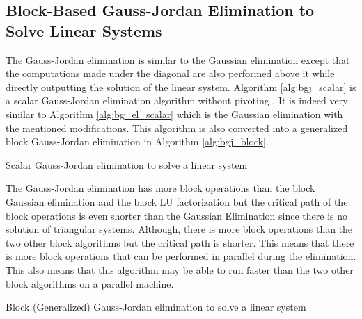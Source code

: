 \subsection{Block-Based Gauss-Jordan Elimination to Solve Linear Systems}

The Gauss-Jordan elimination \cite{Petit1989} \cite{Attaw2012} is similar to the Gaussian elimination except that the computations made under the diagonal are also performed above it while directly outputting the solution of the linear system.
Algorithm \ref{alg:bgj_scalar} is a scalar Gauss-Jordan elimination algorithm without pivoting \cite{Attaw2012}.
It is indeed very similar to Algorithm \ref{alg:bg_el_scalar} which is the Gaussian elimination with the mentioned modifications.
This algorithm is also converted into a generalized block Gauss-Jordan elimination \cite{MelTP1999} in Algorithm \ref{alg:bgj_block}.

\begin{algorithm}[h]
	\DontPrintSemicolon
	\caption{Scalar Gauss-Jordan elimination to solve a linear system \label{alg:bgj_scalar} }
\end{algorithm}

The Gauss-Jordan elimination has more block operations than the block Gaussian elimination and the block LU factorization but the critical path of the block operations is even shorter than the Gaussian Elimination since there is no solution of triangular systems.
Although, there is more block operations than the two other block algorithms but the critical path is shorter.
This means that there is more block operations that can be performed in parallel during the elimination.
This also means that this algorithm may be able to run faster than the two other block algorithms on a parallel machine.

\begin{algorithm}[h]
	\DontPrintSemicolon
	\caption{Block (Generalized) Gauss-Jordan elimination to solve a linear system \label{alg:bgj_block} }
\end{algorithm}

